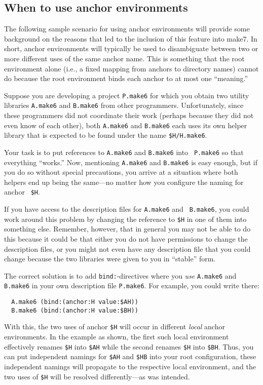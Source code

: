 \subsection{When to use anchor environments}

The following sample scenario for using anchor environments will
provide some background on the reasons that led to the inclusion of
this feature into make7.  In short, anchor environments will typically be
used to disambiguate between two or more different uses of the same
anchor name.  This is something that the root environment alone (i.e.,
a fixed mapping from anchors to directory names) cannot do because the
root environment binds each anchor to at most one ``meaning.''

Suppose you are developing a project {\tt P.make6} for which you obtain
two utility libraries {\tt A.make6} and {\tt B.make6} from other
programmers.  Unfortunately, since these programmers did not
coordinate their work (perhaps because they did not even know of each
other), both {\tt A.make6} and {\tt B.make6} each uses its own helper
library that is expected to be found under the name {\tt \$H/H.make6}.

Your task is to put references to {\tt A.make6} and {\tt B.make6} into {\tt
P.make6} so that everything ``works.''  Now, mentioning {\tt A.make6} and
{\tt B.make6} is easy enough, but if you do so without special
precautions, you arrive at a situation where both helpers end up being
the same---no matter how you configure the naming for anchor {\tt
\$H}.

If you have access to the description files for {\tt A.make6} and {\tt
B.make6}, you could work around this problem by changing the reference to
{\tt \$H} in one of them into something else.  Remember, however, that
in general you may not be able to do this because it could be that
either you do not have permissions to change the description files, or
you might not even have any description file that you could change
because the two libraries were given to you in ``stable'' form.

The correct solution is to add {\tt bind:}-directives where you {\em
use} {\tt A.make6} and {\tt B.make6} in your own description file {\tt P.make6}.
For example, you could write there:

\begin{verbatim}
  A.make6 (bind:(anchor:H value:$AH))
  B.make6 (bind:(anchor:H value:$BH))
\end{verbatim}

With this, the two uses of anchor {\tt \$H} will occur in different
{\em local} anchor environments.  In the example as shown, the first
such local environment effectively renames {\tt \$H} into {\tt \$AH}
while the second renames {\tt \$H} into {\tt \$BH}. Thus, you can put
independent namings for {\tt \$AH} and {\tt \$HB} into your root
configuration, these independent namings will propagate to the
respective local environment, and the two uses of {\tt \$H} will be
resolved differently---as was intended.

